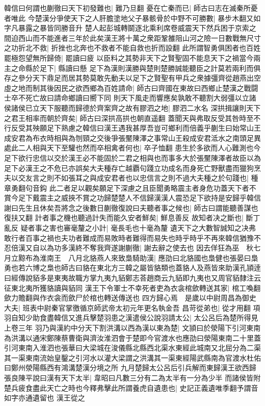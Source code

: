 韓信曰何謂也蒯徹曰天下初發難也|{
	難乃旦翻}
憂在亡秦而已|{
	師古曰志在滅秦所憂者唯此}
今楚漢分爭使天下之人肝膽塗地父子暴骸骨於中野不可勝數|{
	暴步木翻又如字凡暴露之暴皆同勝音升}
楚人起彭城轉鬬逐北乘利席卷威震天下然兵困于京索之間迫西山而不能進者三年於此矣漢王將十萬之衆距鞏雒阻山河之險一日數戰無尺寸之功折北不救|{
	折挫也北奔也不救者不能自救也折而設翻}
此所謂智勇俱困者也百姓罷極怨望無所歸倚|{
	罷讀曰疲}
以臣料之其勢非天下之賢聖固不能息天下之禍當今兩主之命縣於足下|{
	縣讀曰懸}
足下為漢則漢勝與楚則楚勝誠能聽臣之計莫若兩利而俱存之參分天下鼎足而居其勢莫敢先動夫以足下之賢聖有甲兵之衆據彊齊從趙燕出空虛之地而制其後因民之欲西鄉為百姓請命|{
	師古曰齊國在東故曰西鄉止楚漢之戰闘士卒不死亡故曰請命鄉讀曰嚮下同}
則天下風走而響應矣孰敢不聽割大弱彊以立諸侯諸侯已立天下服聽而歸德於齊案齊之故有膠泗之地|{
	膠泗二水名}
深拱揖讓則天下之君王相率而朝於齊矣|{
	師古曰深拱高拱也朝直遥翻}
蓋聞天與弗取反受其咎時至不行反受其殃願足下熟慮之韓信曰漢王遇我甚厚吾豈可鄉利而倍義乎蒯生曰始常山王成安君為布衣時相與為刎頸之交後爭張黶陳澤之事常山王殺成安君泜水之南頭足異處此二人相與天下至驩也然而卒相禽者何也|{
	卒子恤翻}
患生於多欲而人心難測也今足下欲行忠信以交於漢王必不能固於二君之相與也而事多大於張黶陳澤者故臣以為足下必漢王之不危已亦誤矣大夫種存亡越覇句踐立功成名而身死亡野獸盡而獵狗烹夫以交友言之則不如張耳之與成安君者也以忠信言之則不過大夫種之於句踐也|{
	種章勇翻句音鈎}
此二者足以觀矣願足下深慮之且臣聞勇略震主者身危功蓋天下者不賞今足下戴震主之威挾不賞之功歸楚楚人不信歸漢漢人震恐足下欲持是安歸乎韓信謝曰先生且休矣吾將念之後數日蒯徹復說曰夫聽者事之候也|{
	師古曰謂能聽善謀也復扶又翻}
計者事之機也聽過計失而能久安者鮮矣|{
	鮮息善反}
故知者决之斷也|{
	斷丁亂反}
疑者事之害也審毫釐之小計|{
	毫長毛也十毫為釐}
遺天下之大數智誠知之决弗敢行者百事之禍也夫功者難成而易敗時者難得而易失也時乎時乎不再來韓信猶豫不忍倍漢又自以為功多漢終不奪我齊遂謝蒯徹|{
	謝去辭之使去也}
因去佯狂為巫　秋七月立黥布為淮南王　八月北貉燕人來致梟騎助漢|{
	應劭曰北貉國也梟健也張晏曰梟勇也若六博之梟也師古曰貉在東北方三韓之屬皆貉類也蓋貉人及燕皆來助漢孔頴逹曰經傳說貊多是東夷故職方掌九夷九貊鄭志荅趙商云九貊即九夷也又周官貊隸注云征東北夷所獲貉讀與貊同}
漢王下令軍士不幸死者吏為衣衾棺歛轉送其家|{
	棺工喚翻歛力贍翻與作衣衾而歛尸於棺也轉送傳送也}
四方歸心焉　是歲以中尉周昌為御史大夫|{
	班表中尉秦官掌徼循京師武帝太初元年更名執金吾}
昌苛從弟也|{
	從才用翻}
項羽自知少助食盡韓信又進兵擊楚羽患之漢遣侯公說羽請太公|{
	太公呂后為楚所得見上卷三年}
羽乃與漢約中分天下割洪溝以西為漢以東為楚|{
	文頴曰於滎陽下引河東南為洪溝以通宋鄭陳蔡曹衛與濟汝淮泗會于楚即今官渡水也應劭曰滎陽東南二十里蓋引河東南入淮泗也張華曰大梁城在浚儀縣北縣西北渠水東經此城南又北屈分為二渠其一渠東南流始皇鑿之引河水以灌大梁謂之洪溝其一渠東經陽武縣南為官渡水杜佑曰鄭州滎陽縣西有鴻溝楚漢分境之所}
九月楚歸太公呂后引兵解而東歸漢王欲西歸張良陳平說曰漢有天下太半|{
	韋昭曰凡數三分有二為太半有一分為少半}
而諸侯皆附楚兵疲食盡此天亡之時也今釋弗擊此所謂養虎自遺患也|{
	史記正義遺唯季翻予謂音如字亦通遺留也}
漢王從之

